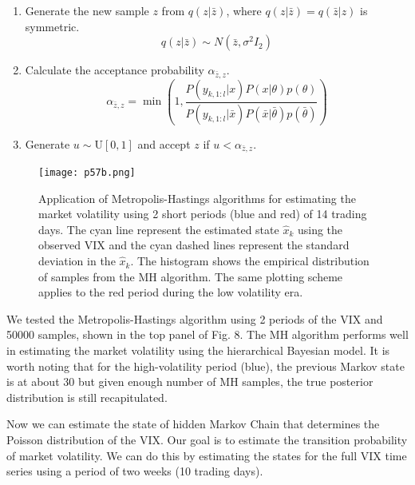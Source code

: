 \documentclass[a4paper, 11pt]{article}
\begin{document}
\begin{enumerate}
\item Generate the new sample $z$ from $q(z|\bar{z})$, where $q(z|\bar{z}) = q(\bar{z}|z)$ is symmetric.
\begin{equation}
q(z|\bar{z}) \sim N(\bar{z}, \sigma^2I_2)
\end{equation}

\item Calculate the acceptance probability $\alpha_{\bar{z}, z}$.
\begin{equation}
\alpha_{\bar{z}, z} = \min\left(1, \frac{P(y_{k,1:l}|x)P(x|\theta)p(\theta)}{P(y_{k,1:l}|\bar{x})P(\bar{x}|\bar{\theta})p(\bar{\theta})} \right)
\end{equation}

\item Generate $u\sim \text{U}[0,1]$ and accept $z$ if $u < \alpha_{\bar{z}, z}$.
\end{enumerate} 

\begin{figure}
	\begin{center}
		\texttt{[image: p57b.png]}
		\caption{Application of Metropolis-Hastings algorithms for estimating the market volatility using 2 short periods (blue and red) of 14 trading days. The cyan line represent the estimated state $\hat{x}_k$ using the observed VIX and the cyan dashed lines represent the standard deviation in the $\hat{x}_k$. The histogram shows the empirical distribution of samples from the MH algorithm. The same plotting scheme applies to the red period during the low volatility era. } 
	\end{center}
\end{figure}

We tested the Metropolis-Hastings algorithm using 2 periods of the VIX and 50000 samples, shown in the top panel of Fig. 8. The MH algorithm performs well in estimating the market volatility using the hierarchical Bayesian model. It is worth noting that for the high-volatility period (blue), the previous Markov state is at about 30 but given enough number of MH samples, the true posterior distribution is still recapitulated. 


Now we can estimate the state of hidden Markov Chain that determines the Poisson distribution of the VIX. Our goal is to estimate the transition probability of market volatility. We can do this by estimating the states for the full VIX time series using a period of two weeks (10 trading days).  
\end{document}
